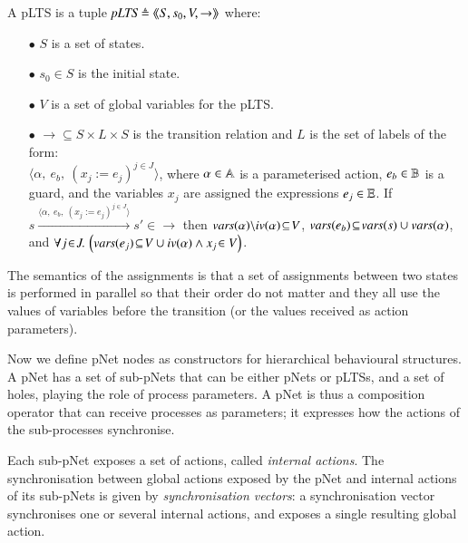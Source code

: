\documentclass{elsarticle}
\newcommand{\LUDO}[1]{\textcolor{darkgreen}{#1}}
\begin{document}
\begin{definition}[pLTS]
\label{pLTS}
A pLTS is a tuple
$\pLTS\triangleq\mylangle S,s_0, V, \to\myrangle$ where:
\begin{itemize}
\item[$\bullet$]
$S$ is a set of states.
\item[$\bullet$]
$s_0 \in S$ is the initial state.
\item[$\bullet$] $V$ is a set of global variables for the pLTS.
\item[$\bullet$] $\to \subseteq S \times L \times S$ is the transition relation and 
$L$ is the set of labels of the form:\\
$\langle \alpha,~e_b,~(x_j\!:= {e}_j)^{j\in J}\rangle$,
where $\alpha \in\mathbb{A}$ is a parameterised action, $e_b \in
\mathbb{B}$ is a guard, and the variables $x_j$ 
are assigned the expressions $e_j\in \mathbb{E}$.
If 
$s \xrightarrow{\langle \alpha,~e_b,~(x_j\!:= {e}_j)^{j\in
		J}\rangle} s'\in \to $ then 
		$\vars(\alpha)\backslash \iv(\alpha)\!\subseteq\! V$, 
		$\vars(e_b)\!\subseteq\! \vars(s)\cup\vars(\alpha)$, and
		$\forall j\!\in\! J .\,\left(\vars(e_j)\!\subseteq\! V\cup\iv(\alpha)\land 
		x_j\!\in V \right)$. %

\end{itemize}
\end{definition}

The semantics of the assignments is that a set of assignments between two states is performed in parallel so that their order do not matter and they all use the values of variables before the transition (or the values received as action parameters).


Now we define
pNet nodes as constructors for hierarchical behavioural structures.
A pNet has a set of sub-pNets that can be either pNets or pLTSs, and a
set of holes, playing the role of process parameters. A pNet is thus a composition operator that can receive processes as parameters; it expresses how the actions of the sub-processes synchronise.

Each sub-pNet exposes
a set of actions, called \emph{internal actions}. The synchronisation between global actions exposed by the pNet and
internal actions of its sub-pNets is given by  \emph{synchronisation vectors}: a
synchronisation vector synchronises one or several internal actions, and
exposes a single resulting global action.
\end{document}
